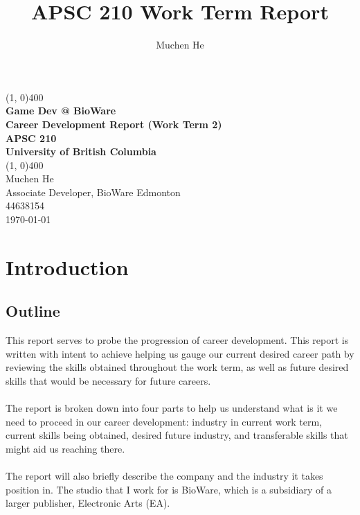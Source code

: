 \documentclass[10pt,letterpaper]{article}
\author{Muchen He}
\title{APSC 210 Work Term Report}
\begin{document}
\begin{titlepage}
	\begin{center}
		\vspace*{3in}
		\line(1, 0){400}\\
		\Huge{\textbf{Game Dev @ BioWare}}\\[0.2cm]
		\large{\textbf{Career Development Report (Work Term 2)}}\\[1cm]
		\Large{\textbf{APSC 210}}\\
		\textbf{University of British Columbia}\\
		\line(1, 0){400}\\
		\vfill
		\Large{Muchen He}\\
		\large{Associate Developer, BioWare Edmonton}\\
		44638154\\

		\today \\
	\end{center}
\end{titlepage}

\setcounter{secnumdepth}{3}
\tableofcontents
\thispagestyle{empty}
\clearpage

\thispagestyle{empty}
\listoffigures
\listoftables
\newpage

\setcounter{page}{1}
\setcounter{section}{-1}

\section{Introduction}\label{introduction}

\subsection{Outline}\label{introduction-outline}

This report serves to probe the progression of career development. This report is written with intent to achieve helping us gauge our current desired career path by reviewing the skills obtained throughout the work term, as well as future desired skills that would be necessary for future careers. \\
\\
The report is broken down into four parts to help us understand what is it we need to proceed in our career development: industry in current work term, current skills being obtained, desired future industry, and transferable skills that might aid us reaching there.\\
\\
The report will also briefly describe the company and the industry it takes position in. The studio that I work for is BioWare, which is a subsidiary of a larger publisher, Electronic Arts (EA).
\end{document}
